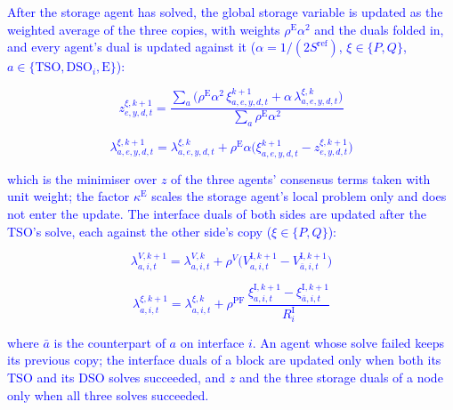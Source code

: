 \documentclass[preprint,12pt]{elsarticle}
\begin{document}
\textcolor{blue}{
    After the storage agent has solved, the global storage variable is updated as the weighted average of the three copies, with weights $\rho^{\text{E}} \alpha^2$ and the duals folded in, and every agent's dual is updated against it ($\alpha = 1/(2 S^{\text{ref}})$, $\xi \in \{P,Q\}$, $a \in \{\text{TSO}, \text{DSO}_i, \text{E}\}$):
}

\textcolor{blue}{
    \begin{equation}
        z^{\xi,k+1}_{e,y,d,t} =
        \frac{\sum_{a} \big( \rho^{\text{E}} \alpha^2\, \xi^{k+1}_{a,e,y,d,t} + \alpha\, \lambda^{\xi,k}_{a,e,y,d,t} \big)}
             {\sum_{a} \rho^{\text{E}} \alpha^2}
        \label{eq:admm_z_update}
    \end{equation}
}

\textcolor{blue}{
    \begin{equation}
        \lambda^{\xi,k+1}_{a,e,y,d,t} = \lambda^{\xi,k}_{a,e,y,d,t} + \rho^{\text{E}} \alpha
        \big( \xi^{k+1}_{a,e,y,d,t} - z^{\xi,k+1}_{e,y,d,t} \big)
    \end{equation}
}

\noindent
\textcolor{blue}{
    which is the minimiser over $z$ of the three agents' consensus terms taken with unit weight; the factor $\kappa^{\text{E}}$ scales the storage agent's local problem only and does not enter the update. The interface duals of both sides are updated after the TSO's solve, each against the other side's copy ($\xi \in \{P,Q\}$):
}

\textcolor{blue}{
    \begin{equation}
        \lambda^{V,k+1}_{a,i,t} = \lambda^{V,k}_{a,i,t} + \rho^{V} \big( V^{\text{I},k+1}_{a,i,t} - V^{\text{I},k+1}_{\bar a,i,t} \big)
        \label{eq:admm_interface_duals}
    \end{equation}
}

\textcolor{blue}{
    \begin{equation}
        \lambda^{\xi,k+1}_{a,i,t} = \lambda^{\xi,k}_{a,i,t} + \rho^{\text{PF}}\,
        \frac{\xi^{\text{I},k+1}_{a,i,t} - \xi^{\text{I},k+1}_{\bar a,i,t}}{R^{\text{I}}_i} 
    \end{equation}
}

\noindent
\textcolor{blue}{
    where $\bar a$ is the counterpart of $a$ on interface $i$. An agent whose solve failed keeps its previous copy; the interface duals of a block are updated only when both its TSO and its DSO solves succeeded, and $z$ and the three storage duals of a node only when all three solves succeeded.
}
\end{document}
